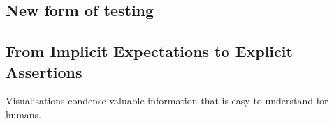 \documentclass[conference]{IEEEtran}
\begin{document}




\subsection{New form of testing}


\subsection{From Implicit Expectations to Explicit Assertions}





Visualisations condense valuable information that is easy to understand for humans.
\end{document}
